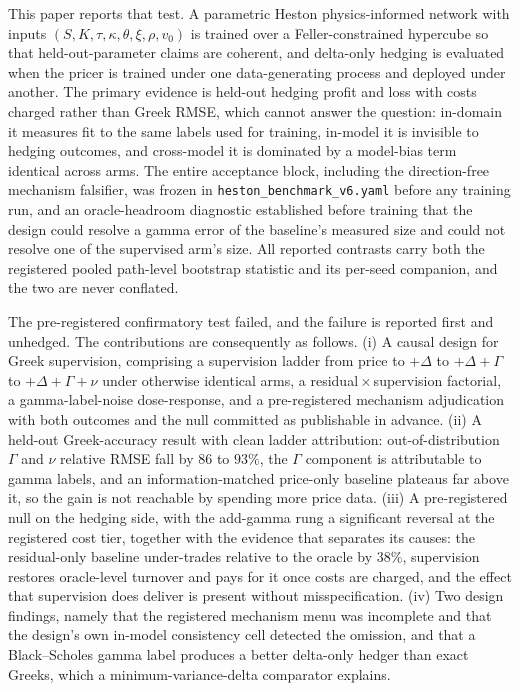 \documentclass[10pt]{article}
\begin{document}
This paper reports that test. A parametric Heston physics-informed network with
inputs $(S, K, \tau, \kappa, \theta, \xi, \rho, v_0)$ is trained over a
Feller-constrained hypercube so that held-out-parameter claims are coherent, and
delta-only hedging is evaluated when the pricer is trained under one
data-generating process and deployed under another. The primary evidence is
held-out hedging profit and loss with costs charged rather than Greek RMSE, which
cannot answer the question: in-domain it measures fit to the same labels used for
training, in-model it is invisible to hedging outcomes, and cross-model it is
dominated by a model-bias term identical across arms. The entire acceptance block,
including the direction-free mechanism falsifier, was frozen in
\texttt{heston\_benchmark\_v6.yaml} before any training run, and an oracle-headroom
diagnostic established before training that the design could resolve a gamma error
of the baseline's measured size and could not resolve one of the supervised arm's
size. All reported contrasts carry both the registered pooled path-level bootstrap
statistic and its per-seed companion, and the two are never conflated.

The pre-registered confirmatory test failed, and the failure is reported first and
unhedged. The contributions are consequently as follows. (i) A causal design for
Greek supervision, comprising a supervision ladder from price to ${+}\Delta$ to
${+}\Delta{+}\Gamma$ to ${+}\Delta{+}\Gamma{+}\nu$ under otherwise identical arms, a
residual\,$\times$\,supervision factorial, a gamma-label-noise dose-response, and a
pre-registered mechanism adjudication with both outcomes and the null committed as
publishable in advance. (ii) A held-out Greek-accuracy result with clean ladder
attribution: out-of-distribution $\Gamma$ and $\nu$ relative RMSE fall by $86$ to
$93\%$, the $\Gamma$ component is attributable to gamma labels, and an
information-matched price-only baseline plateaus far above it, so the gain is not
reachable by spending more price data. (iii) A pre-registered null on the hedging
side, with the add-gamma rung a significant reversal at the registered cost tier,
together with the evidence that separates its causes: the residual-only baseline
under-trades relative to the oracle by $38\%$, supervision restores oracle-level
turnover and pays for it once costs are charged, and the effect that supervision
does deliver is present without misspecification. (iv) Two design findings, namely
that the registered mechanism menu was incomplete and that the design's own
in-model consistency cell detected the omission, and that a Black--Scholes gamma
label produces a better delta-only hedger than exact Greeks, which a
minimum-variance-delta comparator explains.
\end{document}
